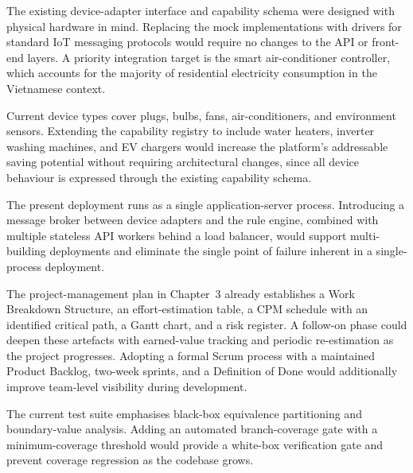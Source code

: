 \begin{description}[style=nextline, leftmargin=1.5em, itemsep=6pt]

  \item[Real-hardware integration via the device-adapter contract]
        The existing device-adapter interface and capability schema were
        designed with physical hardware in mind.  Replacing the mock
        implementations with drivers for standard IoT messaging protocols
        would require no changes to the API or front-end layers.  A
        priority integration target is the smart air-conditioner controller,
        which accounts for the majority of residential electricity consumption in
        the Vietnamese context.

  \item[Broader device and capability coverage]
        Current device types cover plugs, bulbs, fans, air-conditioners, and
        environment sensors.
        Extending the capability registry to include water heaters, inverter
        washing machines, and EV chargers would increase the platform's
        addressable saving potential without requiring architectural changes,
        since all device behaviour is expressed through the existing capability
        schema.

  \item[Horizontal scalability]
        The present deployment runs as a single application-server process.
        Introducing a message broker between device adapters and the rule
        engine, combined with multiple stateless API workers behind a load
        balancer,
        would support multi-building deployments and eliminate the single point
        of failure inherent in a single-process deployment.

  \item[Deeper project-management instrumentation]
        The project-management plan in Chapter~3 already establishes a Work
        Breakdown Structure, an effort-estimation table, a CPM schedule with an
        identified critical path, a Gantt chart, and a risk register.  A
        follow-on phase could deepen these artefacts with earned-value tracking
        and periodic re-estimation as the project progresses.  Adopting a formal
        Scrum process with a maintained Product Backlog, two-week sprints, and a
        Definition of Done would additionally improve
        team-level visibility during development.

  \item[White-box coverage gate]
        The current test suite emphasises black-box equivalence partitioning and
        boundary-value analysis.  Adding an automated branch-coverage gate with a
        minimum-coverage threshold would provide a white-box
        verification gate and prevent coverage regression as the codebase grows.


\end{description}
